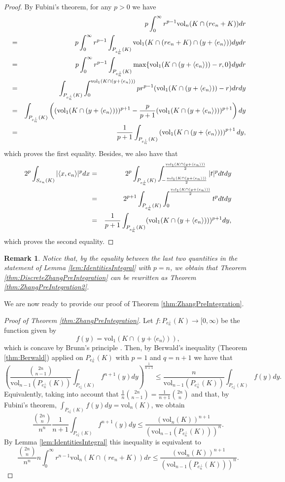 \documentclass[10pt]{amsart}
\newtheorem{rmk}[thm]{Remark}
\def\vol{\mathrm{vol}}
\numberwithin{equation}{section}
\begin{document}
\begin{proof}
By Fubini's theorem, for any $p>0$ we have
\begin{eqnarray*}
&&p\int_0^{\infty}r^{p-1}\vol_n(K\cap(re_n+K))dr\cr
&=&p\int_0^{\infty}r^{p-1}\int_{P_{e_n^\perp}(K)}\vol_1(K\cap(re_n+K)\cap(y+\langle e_n\rangle))dydr\cr
&=&p\int_0^{\infty}r^{p-1}\int_{P_{e_n^\perp}(K)}\max\{\vol_1(K\cap (y+\langle e_n\rangle))-r,0\}dydr\cr
&=&\int_{P_{e_n^\perp}(K)}\int_0^{\vol_1(K\cap (y+\langle e_n\rangle))}pr^{p-1}(\vol_1(K\cap (y+\langle e_n\rangle))-r)drdy\cr
&=&\int_{P_{e_n^\perp}(K)}\left((\vol_1(K\cap (y+\langle e_n\rangle)))^{p+1}-\frac{p}{p+1}(\vol_1(K\cap (y+\langle e_n\rangle)))^{p+1}\right)dy\cr
&=&\frac{1}{p+1}\int_{P_{e_n^\perp}(K)}\left(\vol_1(K\cap (y+\langle e_n\rangle))\right)^{p+1}dy,
\end{eqnarray*}
which proves the first equality. Besides, we also have that
\begin{eqnarray*}
2^p\int_{S_{e_n}(K)}|\langle x,e_n\rangle|^pdx&=&2^p\int_{P_{e_n^\perp}(K)}\int_{-\frac{\vol_1(K\cap(y+\langle e_n\rangle))}{2}}^{\frac{\vol_1(K\cap(y+\langle e_n\rangle))}{2}}|t|^pdtdy\cr
&=&2^{p+1}\int_{P_{e_n^\perp}(K)}\int_{0}^{\frac{\vol_1(K\cap(y+\langle e_n\rangle))}{2}}t^pdtdy\cr
&=&\frac{1}{p+1}\int_{P_{e_n^\perp}(K)}(\vol_1(K\cap(y+\langle e_n\rangle)))^{p+1}dy,
\end{eqnarray*}
which proves the second equality.
\end{proof}

\begin{rmk}\label{rmk:Equivalence}
Notice that, by the equality between the last two quantities in the statement of Lemma \ref{lem:IdentitiesIntegral} with $p=n$, we obtain that Theorem \ref{thm:DiscreteZhangPreIntegration} can be rewritten as Theorem \ref{thm:ZhangPreIntegration2}.
\end{rmk}

We are now ready to provide our proof of Theorem \ref{thm:ZhangPreIntegration}. %


\begin{proof}[Proof of Theorem \ref{thm:ZhangPreIntegration}]
Let $f: P_{e_n^\perp}(K)\to[0,\infty)$ be the function given by
$$
f(y)=\vol_1(K\cap(y+\langle e_n\rangle)),
$$
which is concave by Brunn's principle \cite[Theorem 1.2.2]{BGVV}. Then, by Berwald's inequality (Theorem \ref{thm:Berwald}) applied on $P_{e_n^\perp}(K)$ with $p=1$ and $q=n+1$ we have that
$$
\left(\frac{{{2n}\choose{n-1}}}{\vol_{n-1}(P_{e_n^\perp}(K))}\int_{P_{e_n^\perp}(K)} f^{n+1}(y)dy\right)^\frac{1}{n+1}\leq\frac{n}{\vol_{n-1}(P_{e_n^\perp}(K))}\int_{P_{e_n^\perp}(K)} f(y)dy.
$$
Equivalently, taking into account that $\frac{1}{n}{{2n}\choose{n-1}}=\frac{1}{n+1}{{2n}\choose{n}}$ and that, by Fubini's theorem, $\displaystyle{\int_{P_{e_n^\perp}(K)} f(y)dy=\vol_n(K)}$, we obtain
$$
\frac{{{2n}\choose{n}}}{n^n}\frac{1}{n+1}\int_{P_{e_n^\perp}(K)} f^{n+1}(y)dy\leq\frac{(\vol_n(K))^{n+1}}{(\vol_{n-1}(P_{e_n^\perp}(K)))^n}.
$$
By Lemma \ref{lem:IdentitiesIntegral} this inequality is equivalent to
$$
\frac{{{2n}\choose{n}}}{n^n}n\int_0^\infty r^{n-1}\vol_n(K\cap(re_n+K))dr\leq\frac{(\vol_n(K))^{n+1}}{(\vol_{n-1}(P_{e_n^\perp}(K)))^n}.
$$
\end{proof}
\end{document}
